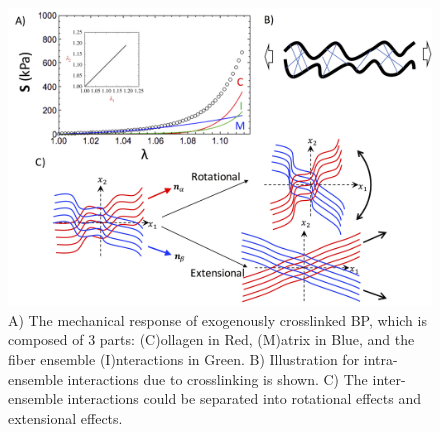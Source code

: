 \begin{figure}[hbt]
\centering
\includegraphics[width=\textwidth]{Images/chapter4/figure6}
\caption{A) The mechanical response of exogenously crosslinked BP, which is composed of 3 parts: (C)ollagen in Red, (M)atrix in Blue, and the fiber ensemble (I)nteractions in Green. B) Illustration for intra-ensemble interactions due to crosslinking is shown. C) The inter-ensemble interactions could be separated into rotational effects and extensional effects. }
\label{fig:EXLforms}
\end{figure}
	
